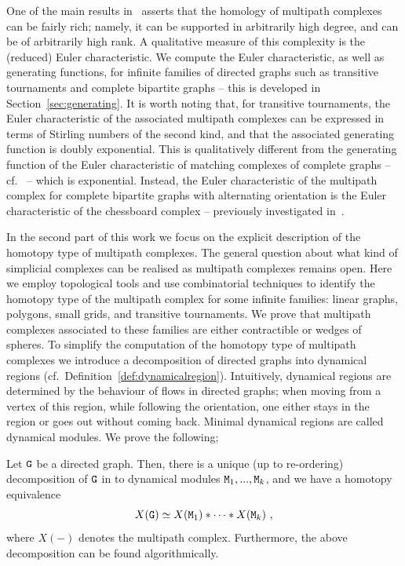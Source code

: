 \documentclass{amsart}
\begin{document}
One of the main results in~\cite{secondo} asserts that the homology of multipath complexes can be fairly rich; namely, it can be supported in arbitrarily high degree, and can be of arbitrarily high rank. 
A qualitative measure of this complexity is the (reduced) Euler characteristic. We compute the Euler characteristic, as well as generating functions, for infinite families of directed graphs such as transitive tournaments and complete bipartite graphs -- this is developed in Section~\ref{sec:generating}.
It is worth noting that, for transitive tournaments, the Euler characteristic of the associated multipath complexes can be expressed in terms of Stirling numbers of the second kind, and that the associated generating function is doubly exponential. This is qualitatively different from the generating function of the Euler characteristic of matching complexes of complete graphs -- cf.~\cite[Table~10.2]{Jonsson} -- which is exponential. %
Instead, the Euler characteristic of the multipath complex for complete bipartite graphs with alternating orientation is  the Euler characteristic of the chessboard complex
-- previously investigated in~\cite{MatchingChess}.

In the second part of this work we focus on the explicit description of the homotopy type of multipath complexes. The general question about what kind of simplicial complexes can be realised as multipath complexes remains open. Here we employ topological tools and use combinatorial techniques to identify the homotopy type of the multipath complex for some infinite families: linear graphs, polygons, small grids, and transitive tournaments. We prove that multipath complexes associated to these families are either contractible or wedges of spheres. 
To simplify the computation of the homotopy type of multipath complexes we introduce a decomposition of directed graphs into dynamical regions (cf.~Definition~\ref{def:dynamicalregion}). Intuitively, dynamical regions are determined by the behaviour of flows in directed graphs; 
when moving from a vertex of this region, while following the orientation, one either stays in the region or goes out without coming back. Minimal dynamical regions are called dynamical modules. We prove the following;


\begin{thm}
Let ${\tt G}$ be a directed graph. Then, there is a unique (up to re-ordering) decomposition of ${\tt G}$ in to dynamical modules ${\tt M}_1,...,{\tt M}_{k}$, and we have a homotopy equivalence
 \[X({\tt G}) \simeq X({\tt M}_1) \ast \cdots \ast X({\tt M}_k) \ ,\]
where $X(-)$ denotes the multipath complex. Furthermore, the above decomposition can be found algorithmically.
\end{thm}
 
\end{document}
